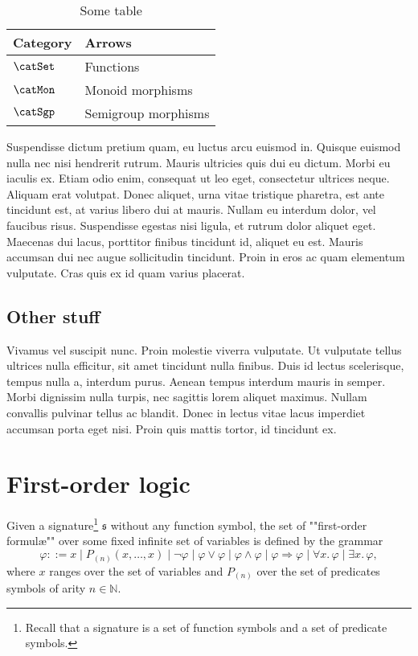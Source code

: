 \documentclass{fancy-article}
\begin{document}
\begin{table}
  \centering
  \begin{tabular}{ll}
    \toprule
    Category & Arrows \\
    \midrule
    $\catSet$ & Functions \\
    $\catMon$ & Monoid morphisms \\
    $\catSgp$ & Semigroup morphisms \\
    \bottomrule
  \end{tabular}
  \caption{Some table}
\end{table}
\AP Suspendisse dictum pretium quam, eu luctus arcu euismod in. Quisque euismod nulla nec nisi hendrerit rutrum. Mauris ultricies quis dui eu dictum. Morbi eu iaculis ex. Etiam odio enim, consequat ut leo eget, consectetur ultrices neque. Aliquam erat volutpat. Donec aliquet, urna vitae tristique pharetra, est ante tincidunt est, at varius libero dui at mauris. Nullam eu interdum dolor, vel faucibus risus. Suspendisse egestas nisi ligula, et rutrum dolor aliquet eget. Maecenas dui lacus, porttitor finibus tincidunt id, aliquet eu est. Mauris accumsan dui nec augue sollicitudin tincidunt. Proin in eros ac quam elementum vulputate. Cras quis ex id quam varius placerat.

\subsection{Other stuff}

\AP Vivamus vel suscipit nunc. Proin molestie viverra vulputate. Ut vulputate tellus ultrices nulla efficitur, sit amet tincidunt nulla finibus. Duis id lectus scelerisque, tempus nulla a, interdum purus. Aenean tempus interdum mauris in semper. Morbi dignissim nulla turpis, nec sagittis lorem aliquet maximus. Nullam convallis pulvinar tellus ac blandit. Donec in lectus vitae lacus imperdiet accumsan porta eget nisi. Proin quis mattis tortor, id tincidunt ex.


\section{First-order logic}


\AP Given a signature\footnote{Recall that a signature is a set of function 
symbols and a set of predicate symbols.}
$\mathfrak{s}$ without any function symbol,
the set of ""first-order formul\ae{}"" over some fixed infinite set of
variables is defined by the grammar
\[
  \varphi ::=
  x \mid P_{(n)}(x, \hdots, x) \mid \neg \varphi \mid \varphi \lor \varphi \mid \varphi \land \varphi
  \mid \varphi \Rightarrow \varphi \mid \forall x.\, \varphi \mid \exists x.\,
  \varphi,
\]
where $x$ ranges over the set of variables and $P_{(n)}$ over the
set of predicates symbols of arity $n\in \mathbb{N}$.
\end{document}
